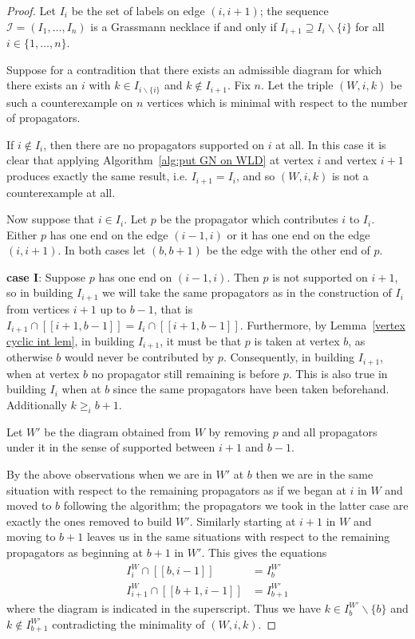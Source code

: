 \documentclass[11pt]{article}
\newcommand{\II}{\mathcal{I}}
\newcommand{\interval}[2]{[\![#1,#2]\!]}
\theoremstyle{remark}
\theoremstyle{definition}
\begin{document}
\begin{proof}
Let $I_i$ be the set of labels on edge $(i,i+1)$; the sequence $\II = (I_1, \dots, I_n)$ is a Grassmann necklace if and only if $I_{i+1} \supseteq I_i \backslash \{i\}$ for all $i \in \{1, \dots, n\}$.


Suppose for a contradition that there exists an admissible diagram for which there exists an $i$ with $k\in I_{i\backslash\{i\}}$ and $k \not\in I_{i+1}$.  Fix $n$.  Let the triple $(W, i, k)$ be such a counterexample on $n$ vertices which is minimal with respect to the number of propagators. %

If $i \not\in I_i$, then there are no propagators supported on $i$ at all.  In this case it is clear that applying Algorithm~\ref{alg:put GN on WLD} at vertex $i$ and vertex $i+1$ produces exactly the same result, i.e. $I_{i+1} = I_i$, and so $(W, i, k)$ is not a counterexample at all.

Now suppose that $i \in I_i$.  Let $p$ be the propagator which contributes $i$ to $I_i$.  Either $p$ has one end on the edge $(i-1, i)$ or it has one end on the edge $(i, i+1)$.  In both cases let $(b, b+1)$ be the edge with the other end of $p$.

\textbf{case I}:  Suppose $p$ has one end on $(i-1, i)$.  Then $p$ is not supported on $i+1$, so in building $I_{i+1}$ we will take the same propagators as in the construction of $I_i$ from vertices $i+1$ up to $b-1$, that is $I_{i+1} \cap \interval{i+1}{b-1} = I_{i} \cap \interval{i+1}{b-1}$.  Furthermore, by Lemma~\ref{vertex cyclic int lem}, in building $I_{i+1}$, it must be that $p$ is taken at vertex $b$, as otherwise $b$ would never be contributed by $p$.    Consequently, in building $I_{i+1}$, when at vertex $b$ no propagator still remaining is before $p$.  This is also true in building $I_i$ when at $b$ since the same propagators have been taken beforehand.  Additionally $k\geq_i b+1$.

Let $W'$ be the diagram obtained from $W$ by removing $p$ and all propagators under it in the sense of supported between $i+1$ and $b-1$.

By the above observations when we are in $W'$ at $b$ then we are in the same situation with respect to the remaining propagators as if we began at $i$ in $W$ and moved to $b$ following the algorithm; the propagators we took in the latter case are exactly the ones removed to build $W'$.  Similarly starting at $i+1$ in $W$ and moving to $b+1$ leaves us in the same situations with respect to the remaining propagators as beginning at $b+1$ in $W'$.  This gives the equations
\begin{align*}
  I_i^W \cap \interval{b}{i-1} & = I_b^{W'} \\
  I_{i+1}^W \cap \interval{b+1}{i-1} & = I_{b+1}^{W'}
\end{align*}
where the diagram is indicated in the superscript.
Thus we have $k\in I_b^{W'}\backslash\{b\}$ and $k\not\in I_{b+1}^{W'}$ contradicting the minimality of $(W, i, k)$.


\end{proof}
\end{document}

